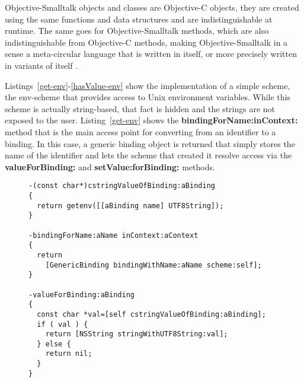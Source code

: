 \documentclass[preprint,authoryear]{acm_proc_article-sp}
\begin{document}
Objective-Smalltalk objects and classes are Objective-C objects, they are created using
the same functions and data structures and are indistinguishable at runtime.
The same goes for Objective-Smalltalk methods, which are also indistinguishable from
Objective-C methods, making Objective-Smalltalk in a sense a meta-circular language
that is written in itself, or more precisely written in variants of itself \cite{kleinvm}\cite{squeak}.

Listings~\ref{get-env}-\ref{hasValue-env} show the implementation of a simple scheme,
the env-scheme that provides access to Unix environment variables.  While this scheme
is actually string-based, that fact is hidden and the strings are not exposed to the user.
Listing~\ref{get-env}
shows the {\bf bindingForName:inContext:} method that is the main access point for
converting from an identifier to a binding.  In this case, a generic binding object is returned
that simply stores the name of the identifier and lets the scheme that created it resolve
access via the {\bf valueForBinding:} and {\bf setValue:forBinding:} methods.

%
%

\begin{figure}[htbp]
\begin{lstlisting}[style=L,label=get-env,caption=Basic lookup in env: scheme.]
-(const char*)cstringValueOfBinding:aBinding
{
  return getenv([[aBinding name] UTF8String]);
}

-bindingForName:aName inContext:aContext
{
  return
    [GenericBinding bindingWithName:aName scheme:self];
}

-valueForBinding:aBinding
{
  const char *val=[self cstringValueOfBinding:aBinding];
  if ( val ) {
    return [NSString stringWithUTF8String:val];
  } else {
    return nil;
  }
}
\end{lstlisting}
\end{figure}
\end{document}
